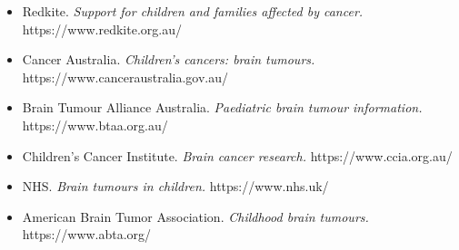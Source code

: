 \begin{itemize}
    \item Redkite. \textit{Support for children and families affected by cancer.} https://www.redkite.org.au/
    \item Cancer Australia. \textit{Children's cancers: brain tumours.} https://www.canceraustralia.gov.au/
    \item Brain Tumour Alliance Australia. \textit{Paediatric brain tumour information.} https://www.btaa.org.au/
    \item Children's Cancer Institute. \textit{Brain cancer research.} https://www.ccia.org.au/
    \item NHS. \textit{Brain tumours in children.} https://www.nhs.uk/
    \item American Brain Tumor Association. \textit{Childhood brain tumours.} https://www.abta.org/
\end{itemize}
